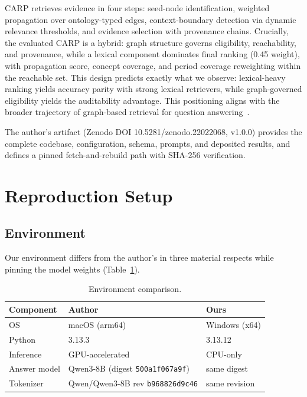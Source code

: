 \documentclass[11pt]{article}
\begin{document}
CARP retrieves evidence in four steps: seed-node identification, weighted propagation over ontology-typed edges, context-boundary detection via dynamic relevance thresholds, and evidence selection with provenance chains. Crucially, the evaluated CARP is a hybrid: graph structure governs eligibility, reachability, and provenance, while a lexical component dominates final ranking (0.45 weight), with propagation score, concept coverage, and period coverage reweighting within the reachable set. This design predicts exactly what we observe: lexical-heavy ranking yields accuracy parity with strong lexical retrievers, while graph-governed eligibility yields the auditability advantage. This positioning aligns with the broader trajectory of graph-based retrieval for question answering~\cite{edge2024, han2025, gao2023}.

The author's artifact (Zenodo DOI 10.5281/zenodo.22022068, v1.0.0) provides the complete codebase, configuration, schema, prompts, and deposited results, and defines a pinned fetch-and-rebuild path with SHA-256 verification.

\section{Reproduction Setup}

\subsection{Environment}

Our environment differs from the author's in three material respects while pinning the model weights (Table~\ref{tab:env}).

\begin{table}[h]
\centering
\caption{Environment comparison.}
\label{tab:env}
\begin{tabular}{lll}
\toprule
\textbf{Component} & \textbf{Author} & \textbf{Ours} \\
\midrule
OS & macOS (arm64) & Windows (x64) \\
Python & 3.13.3 & 3.13.12 \\
Inference & GPU-accelerated & CPU-only \\
Answer model & Qwen3-8B (digest \texttt{500a1f067a9f}) & same digest \\
Tokenizer & Qwen/Qwen3-8B rev \texttt{b968826d9c46} & same revision \\
\bottomrule
\end{tabular}
\end{table}
\end{document}
